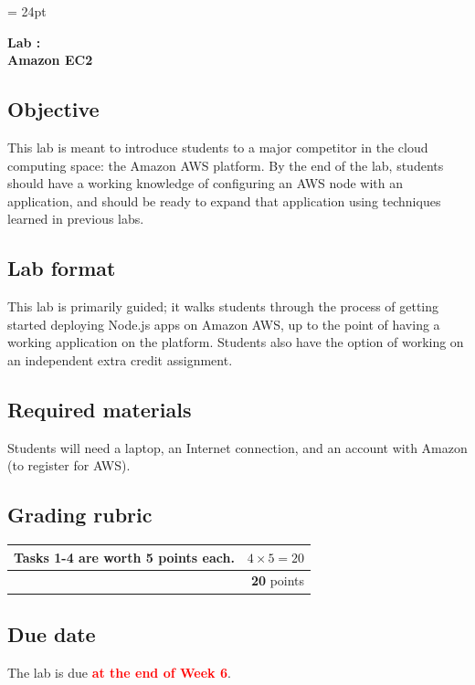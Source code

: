 \documentclass{article}
\newcommand{\labduedate}{at the end of Week 6}
\begin{document}
\chead{\textcolor{Gray}{CSSE491 -- Scalable Computing Lab Assignment}}
\headsep = 24pt

\begin{center}
{ \large
\textbf{Lab \labnumber: \longproductname} \\
\textbf{Amazon EC2}
}
\end{center}

\subsection*{Objective}
This lab is meant to introduce students to a major competitor in the cloud computing space: the Amazon AWS platform. By the end of the lab, students should have a working knowledge of configuring an AWS node with an application, and should be ready to expand that application using techniques learned in previous labs.

\subsection*{Lab format}
This lab is primarily guided; it walks students through the process of getting started deploying Node.js apps on Amazon AWS, up to the point of having a working application on the platform. Students also have the option of working on an independent extra credit assignment.

\subsection*{Required materials}
Students will need a laptop, an Internet connection, and an account with Amazon (to register for AWS).

\subsection*{Grading rubric}
\begin{tabular}{p{5.5in} r}
Tasks 1-4 are worth \textbf{5} points each. & $4 \times 5 = 20$ \\ \hline
& \textbf{20} points
\end{tabular}

\subsection*{Due date}
The lab is due \textcolor{red}{\textbf{\labduedate}}.


\end{document}
